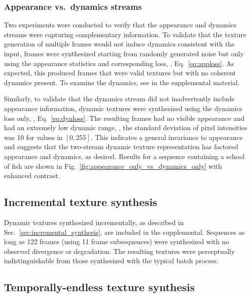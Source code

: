 \clearpage

\clearpage

\subsubsection{Appearance vs.\ dynamics streams}

Two experiments were conducted to verify that the appearance and dynamics
streams were capturing complementary information.
To validate that the texture generation of multiple frames
would not induce dynamics consistent with the input, frames were synthesized
starting from randomly generated noise but only using the
appearance statistics and corresponding loss, \ie,
Eq.\ \ref{eq:apploss}.
As expected, this produced frames that were valid textures but
with no coherent dynamics present.
To examine the dynamics, see 
 in the supplemental material.

Similarly, to validate that the dynamics stream did not 
inadvertently include appearance information, dynamic textures were synthesized
using the dynamics loss only, \ie, Eq.\ \ref{eq:dynloss}.
The resulting frames had no visible appearance and had
an extremely low dynamic range, \ie, the standard
deviation of pixel intensities was 10 for values in $[0,255]$.
This indicates a general invariance to appearance and 
suggests that the two-stream dynamic texture representation
has factored appearance and dynamics, as desired.
Results for a sequence containing a school of fish are shown in
Fig.\ \ref{fig:appearance_only_vs_dynamics_only} with enhanced contrast.



\subsection{Incremental texture synthesis}

Dynamic textures synthesized incrementally, as described in Sec.\
\ref{sec:incremental_synthesis}, are included in the supplemental.
Sequences as long as 122 frames (using 11 frame subsequences) were synthesized
with no observed divergence or degradation. The resulting textures were 
perceptually indistinguishable from those synthesized with the typical batch process.

\subsection{Temporally-endless texture synthesis}

